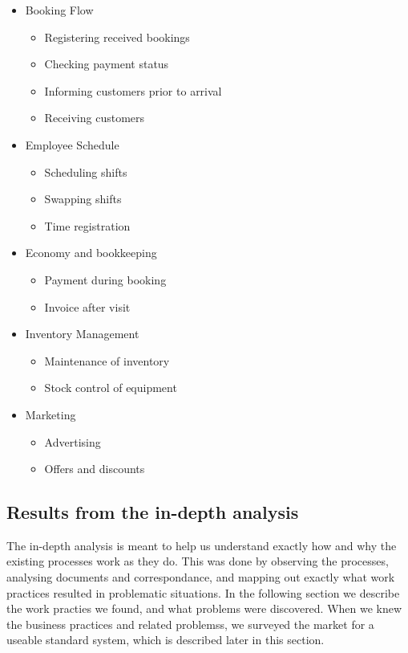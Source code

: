 \begin{itemize}
	\item Booking Flow
	\begin{itemize}	
		\item Registering received bookings
		\item Checking payment status
		\item Informing customers prior to arrival
		\item Receiving customers
	\end{itemize}

	\item Employee Schedule
	\begin{itemize}
		\item Scheduling shifts
		\item Swapping shifts
		\item Time registration
	\end{itemize}

	\item Economy and bookkeeping
	\begin{itemize}
		\item Payment during booking
		\item Invoice after visit
	\end{itemize}

	\item Inventory Management
	\begin{itemize}	
		\item Maintenance of inventory
		\item Stock control of equipment
	\end{itemize}

	\item Marketing
	\begin{itemize}
		\item Advertising
		\item Offers and discounts
	\end{itemize}
\end{itemize} 


\subsection{Results from the in-depth analysis}

The in-depth analysis is meant to help us understand exactly how and why the 
existing processes work as they do. This was done by observing the processes,
analysing documents and correspondance, and mapping out exactly what work 
practices resulted in problematic situations. In the following section we describe the 
work practies we found, and what problems were discovered. When we knew the
business practices and related problemss, we surveyed the market for a useable 
standard system, which is described later in this section.

